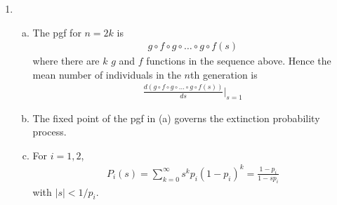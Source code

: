 \documentclass[a4paper,10pt]{article}
\theoremstyle{definition}
\begin{document}
\begin{enumerate}
\begin{enumerate}[(a)]
\end{enumerate}
\item 
\begin{enumerate}[(a)]
\item The pgf for $n=2k$ is 
\begin{align*}
g\circ f \circ g \circ \ldots  \circ g \circ f(s)
\end{align*}
where there are $k$ $g$ and $f$ functions in the sequence above. Hence the mean number of individuals in the $n$th generation is 
\begin{align*}
\frac{d(g\circ f \circ g \circ \ldots  \circ g \circ f(s))}{ds}\bigg|_{s=1}
\end{align*}
\item The fixed point of the pgf in (a) governs the extinction probability process.
\item For $i=1,2$, 
\begin{align*}
P_i(s)=\sum_{k=0}^{\infty}s^kp_i(1-p_i)^k=\frac{1-p_i}{1-sp_i}
\end{align*}
with $|s|<1/p_i$.
\end{enumerate}
\end{enumerate}
\end{document}
